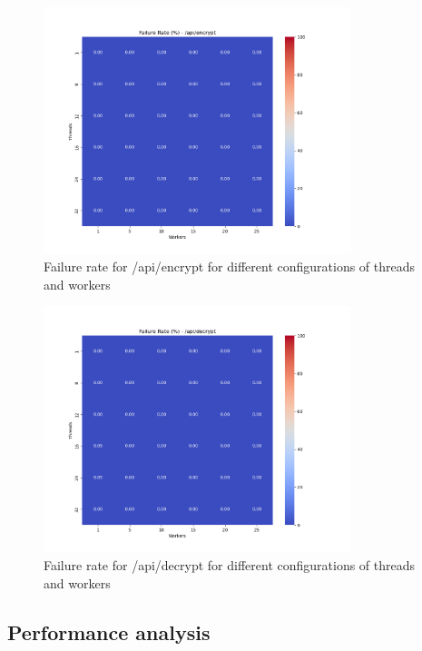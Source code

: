 \documentclass[cic,tc,english]{iiufrgs}
\begin{document}
            \begin{figure}[h]
                \centering
                \includegraphics[width=0.8\textwidth]{images/phase1/failure_rate__api_encrypt.png}
                \caption{Failure rate for /api/encrypt for different configurations of threads and workers}
                \label{fig:failurerateencrypt}
            \end{figure}

            \begin{figure}[h]
                \centering
                \includegraphics[width=0.8\textwidth]{images/phase1/failure_rate__api_decrypt.png}
                \caption{Failure rate for /api/decrypt for different configurations of threads and workers}
                \label{fig:failureratedecrypt}
            \end{figure}

        \subsection{Performance analysis}
            \label{sec:timeencryptdecrypt}
\end{document}
